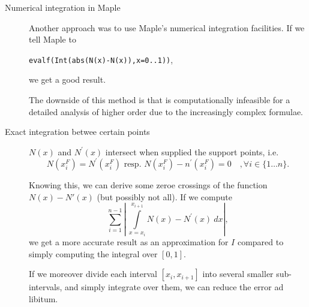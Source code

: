\documentclass{article}
\newcommand{\todo}[2][]{\textcolor{red}{TODO\ifthenelse{\equal{#1}{}}{}{[#1]}: #2}}
\begin{document}
\begin{description}
\item[Numerical integration in Maple] Another approach was to use Maple's numerical integration facilities. If we tell Maple to
  \begin{center}
    \texttt{evalf(Int(abs(N(x)-N(x)),x=0..1))},
  \end{center}
  we get a good result. 


  

  The downside of this method is that is computationally infeasible for a detailed analysis of higher order due to the increasingly complex formulae.
\item[Exact integration betwee certain points] $N\left(x\right)$ and $N^\prime\left(x\right)$ intersect when supplied the support points, i.e.\,
  \begin{equation*}
    N\left(x_i^F\right) = N^\prime\left(x_i^F\right) \text{ resp. } N\left( x_i^F \right) - n^\prime\left( x_i^F \right) = 0 \quad , \forall i \in \{1 \dots n\}.
  \end{equation*}

  Knowing this, we can derive some zeroe crossings of the function $N(x)-N'(x)$ (but possibly not all). If we compute
  \begin{equation*}
    \sum\limits_{i=1}^{n-1} \left|\ \int\limits_{x=x_i}^{x_{i+1}} N\left(x\right) - N^\prime\left(x\right)\ dx \right|,
  \end{equation*}
  we get a more accurate result as an approximation for $I$ compared to simply computing the integral over $[0,1]$.

  If we moreover divide each interval $[x_i,x_{i+1}]$ into several smaller sub-intervals, and simply integrate over them, we can reduce the error ad libitum.


\end{description}
\end{document}
